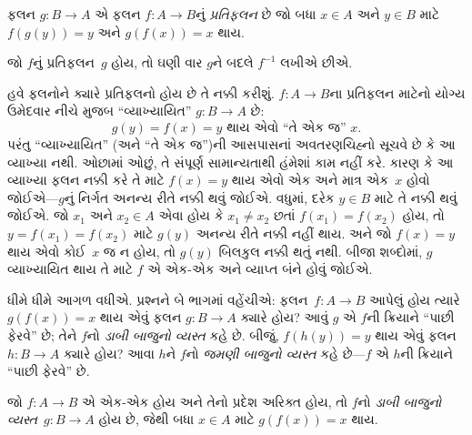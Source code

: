 \begin{defn}
ફલન $g \colon B \to A$ એ ફલન $f
\colon A \to B$નું \emph{પ્રતિફલન} છે જો બધા
$x \in A$ અને $y \in B$ માટે
$f(g(y)) = y$ અને $g(f(x)) = x$ થાય.
\end{defn}

જો $f$નું પ્રતિફલન~$g$ હોય, તો ઘણી વાર $g$ને
બદલે $f^{-1}$ લખીએ છીએ.

\begin{explain}
હવે ફલનોને ક્યારે પ્રતિફલનો હોય છે તે નક્કી કરીશું.
$f\colon A \to B$ના પ્રતિફલન માટેનો યોગ્ય ઉમેદવાર
નીચે મુજબ “વ્યાખ્યાયિત” $g\colon B \to A$ છે:
\[
g(y) = \text{$f(x) = y$ થાય એવો “તે એક જ” $x$.}
\]
પરંતુ “વ્યાખ્યાયિત” (અને “તે એક જ”)ની આસપાસનાં
અવતરણચિહ્નો સૂચવે છે કે આ વ્યાખ્યા નથી. ઓછામાં ઓછું,
તે સંપૂર્ણ સામાન્યતાથી હંમેશાં કામ નહીં કરે. કારણ કે
આ વ્યાખ્યા ફલન નક્કી કરે તે માટે $f(x) =
y$ થાય એવો એક અને માત્ર એક~$x$ હોવો જોઈએ---$g$નું
નિર્ગત અનન્ય રીતે નક્કી થવું જોઈએ. વધુમાં, દરેક
$y \in B$ માટે તે નક્કી થવું જોઈએ. જો $x_1$ અને
$x_2 \in
A$ એવા હોય કે $x_1 \neq x_2$ છતાં
$f(x_1) = f(x_2)$ હોય, તો $y = f(x_1) = f(x_2)$
માટે $g(y)$ અનન્ય રીતે નક્કી નહીં થાય. અને જો
$f(x) = y$ થાય એવો કોઈ~$x$ જ ન હોય, તો
$g(y)$ બિલકુલ નક્કી થતું નથી. બીજા શબ્દોમાં,
$g$ વ્યાખ્યાયિત થાય તે માટે $f$ એ એક-એક
અને વ્યાપ્ત બંને હોવું જોઈએ.

ધીમે ધીમે આગળ વધીએ. પ્રશ્નને બે ભાગમાં વહેંચીએ:
ફલન~$f\colon A \to B$ આપેલું હોય ત્યારે
$g(f(x)) = x$ થાય એવું ફલન $g\colon B \to A$
ક્યારે હોય? આવું $g$ એ $f$ની ક્રિયાને “પાછી ફેરવે” છે;
તેને $f$નો \emph{ડાબી બાજુનો વ્યસ્ત} કહે છે.
બીજું, $f(h(y)) = y$ થાય એવું ફલન
$h\colon B \to A$ ક્યારે હોય? આવા $h$ને
$f$નો \emph{જમણી બાજુનો વ્યસ્ત} કહે છે---$f$
એ $h$ની ક્રિયાને “પાછી ફેરવે” છે.
\end{explain}

\begin{prop}
જો $f\colon A \to B$ એ એક-એક હોય અને તેનો પ્રદેશ અરિક્ત હોય, તો
$f$નો \emph{ડાબી બાજુનો વ્યસ્ત}~$g\colon B \to A$
હોય છે, જેથી બધા $x
\in A$ માટે $g(f(x)) = x$ થાય.
\end{prop}


